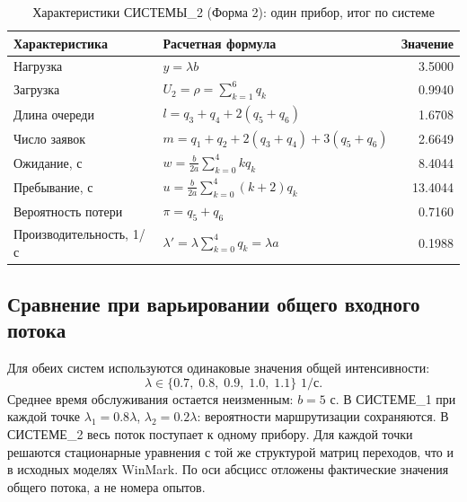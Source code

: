 \documentclass[a4paper,12pt]{article}
\begin{document}
    \begin{table}[H]
        \centering
        \caption{Характеристики СИСТЕМЫ\_2 (Форма 2): один прибор, итог по системе}
        \label{tab:form2-system2}
        \small
        \renewcommand{\arraystretch}{1.8}
        \begin{tabularx}{\linewidth}{|l|X|r|}
\hline
Характеристика & Расчетная формула & Значение \\ \hline
Нагрузка & $y=\lambda b$ & 3.5000 \\ \hline
Загрузка & $U_2=\rho=\sum_{k=1}^{6}q_k$ & 0.9940 \\ \hline
Длина очереди & $l=q_3+q_4+2(q_5+q_6)$ & 1.6708 \\ \hline
Число заявок & $m=q_1+q_2+2(q_3+q_4)+3(q_5+q_6)$ & 2.6649 \\ \hline
Ожидание, с & $w=\frac{b}{2a}\sum_{k=0}^{4}kq_k$ & 8.4044 \\ \hline
Пребывание, с & $u=\frac{b}{2a}\sum_{k=0}^{4}(k+2)q_k$ & 13.4044 \\ \hline
Вероятность потери & $\pi=q_5+q_6$ & 0.7160 \\ \hline
Производительность, 1/с & $\lambda'=\lambda\sum_{k=0}^{4}q_k=\lambda a$ & 0.1988 \\ \hline
        \end{tabularx}
    \end{table}

    \subsection{Сравнение при варьировании общего входного потока}
    Для обеих систем используются одинаковые значения общей интенсивности:
    \[
        \lambda\in\{0.7,\;0.8,\;0.9,\;1.0,\;1.1\}\text{ 1/с}.
    \]
    Среднее время обслуживания остается неизменным: $b=5$ с. В СИСТЕМЕ\_1 при каждой точке
    $\lambda_1=0.8\lambda$, $\lambda_2=0.2\lambda$: вероятности маршрутизации
    сохраняются. В СИСТЕМЕ\_2 весь поток поступает к одному прибору.
    Для каждой точки решаются стационарные уравнения с той же структурой
    матриц переходов, что и в исходных моделях WinMark. По оси абсцисс
    отложены фактические значения общего потока, а не номера опытов.

    \newcommand{\comparisonrows}{%
        0.7 & 1.5193 & 0.9940 & 0.5659 & 0.7160 & 0.3039 & 0.1988 \\ \hline%
        0.8 & 1.5920 & 0.9964 & 0.6020 & 0.7509 & 0.3184 & 0.1993 \\ \hline%
        0.9 & 1.6523 & 0.9977 & 0.6328 & 0.7783 & 0.3305 & 0.1995 \\ \hline%
        1.0 & 1.7024 & 0.9985 & 0.6595 & 0.8003 & 0.3405 & 0.1997 \\ \hline%
        1.1 & 1.7441 & 0.9990 & 0.6829 & 0.8184 & 0.3488 & 0.1998 \\ \hline%
    }
\end{document}
